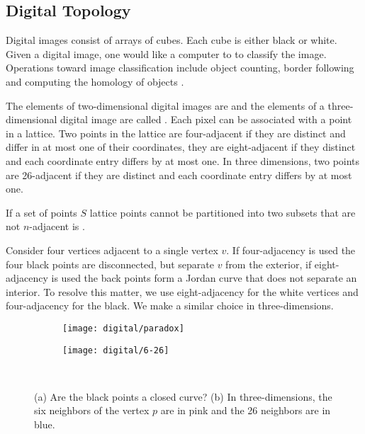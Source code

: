 \subsection{Digital Topology}
\label{sec:digital-topology}

Digital images consist of arrays of cubes.
Each cube is either black or white.
Given a digital image, one would like 
a computer to to classify the image.
Operations toward image classification include
object counting, border following and computing 
the homology of objects \cite{kong_digital_1989}.

The elements of two-dimensional digital images
are  and the elements of a three-dimensional
digital image are called .
Each pixel can be associated with a point in a lattice.
Two points in the lattice are four-adjacent if
they are  distinct and differ in at most one of their
coordinates, they are eight-adjacent
if they distinct and each coordinate entry differs by at most one.
In three dimensions, two points
are 26-adjacent if they are distinct and each coordinate 
entry differs by at most one.

If a set of points $S$ lattice points cannot be
partitioned into two subsets that are not
$n$-adjacent is .

Consider four vertices adjacent to a single vertex $v$.
If four-adjacency is used the four black points are disconnected,
but separate $v$ from the exterior, if eight-adjacency is used
the back points form a Jordan curve that does not separate
an interior. To resolve this matter, we use eight-adjacency
for the white vertices and four-adjacency for the black.
We make a similar choice in three-dimensions.

\begin{figure}[htb]
        \centering
        \begin{subfigure}[b]{0.35\textwidth}
        \texttt{[image: digital/paradox]}
        \caption{}
          \label{fig:paradox}
        \end{subfigure}
          \hspace{.0cm}
         \begin{subfigure}[b]{0.40\textwidth}
        \texttt{[image: digital/6-26]}
        \caption{}
        \label{fig:6-26}
        \end{subfigure}\\
		\caption{(a) Are the black points a closed curve? (b) In three-dimensions,
		the six neighbors of the vertex $p$ are in pink and the 26 neighbors are in
		blue. 
		\label{fig:adjacency}}
\end{figure}

